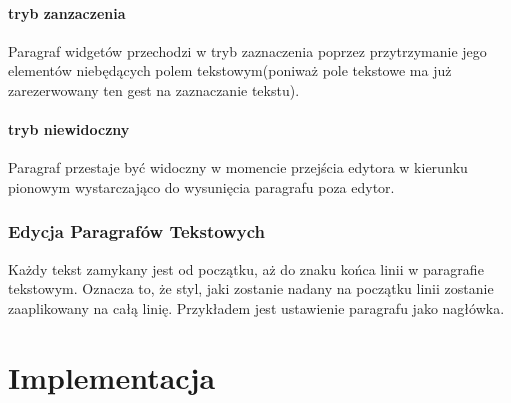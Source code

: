 \documentclass[shortabstract]{iithesis}
\begin{document}
\subsubsection{tryb zanzaczenia}

Paragraf widgetów przechodzi w tryb zaznaczenia poprzez przytrzymanie jego elementów niebędących polem tekstowym(poniważ pole tekstowe ma już zarezerwowany ten gest na zaznaczanie tekstu).

\subsubsection{tryb niewidoczny}

Paragraf przestaje być widoczny w momencie przejścia edytora w kierunku pionowym wystarczająco do wysunięcia paragrafu poza edytor.

\subsection{Edycja Paragrafów Tekstowych}

Każdy tekst zamykany jest od początku, aż do znaku końca linii w paragrafie tekstowym. Oznacza to, że styl, jaki zostanie nadany na początku linii zostanie zaaplikowany na całą linię. Przykładem jest ustawienie paragrafu jako nagłówka.



\chapter{Implementacja}


\end{document}
